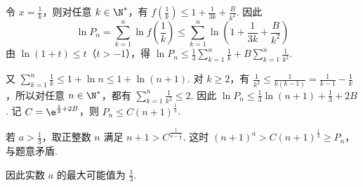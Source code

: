 \documentclass[UTF8,a4paper,oneside,11pt]{ctexbook}
\begin{document}
\begin{solution}
\begin{enumerate}
令 \(x=\frac{1}{k}\)，则对任意 \(k\in \N^*\)，有 \(f\left( \frac{1}{k} \right)\le 1+\frac{1}{3k}+\frac{B}{k^2}\). 因此
\[
\ln P_n=\sum_{k=1}^{n}\ln f\left( \frac{1}{k} \right)
\le \sum_{k=1}^{n}\ln \left( 1+\frac{1}{3k}+\frac{B}{k^2} \right)
\]
由 \(\ln \left( 1+t \right)\le t\)（\(t>-1\)），得 \(\ln P_n\le \frac{1}{3}\sum_{k=1}^{n}\frac{1}{k}+B\sum_{k=1}^{n}\frac{1}{k^2}\).

又 \(\sum_{k=1}^{n}\frac{1}{k}\le 1+\ln n\le 1+\ln \left( n+1 \right)\). 对 \(k\ge 2\)，有 \(\frac{1}{k^2}\le \frac{1}{k\left( k-1 \right)}=\frac{1}{k-1}-\frac{1}{k}\)，所以对任意 \(n\in \N^*\)，都有 \(\sum_{k=1}^{n}\frac{1}{k^2}\le 2\). 因此
\(\ln P_n\le \frac{1}{3}\ln \left( n+1 \right)+\frac{1}{3}+2B\).
记 \(C=\e^{\frac{1}{3}+2B}\)，则 \(P_n\le C\left( n+1 \right)^{\frac{1}{3}}\).

若 \(a>\frac{1}{3}\)，取正整数 \(n\) 满足 \(n+1>C^{\frac{1}{a-\frac{1}{3}}}\). 这时 \(\left( n+1 \right)^a>C\left( n+1 \right)^{\frac{1}{3}}\ge P_n\)，与题意矛盾.

因此实数 \(a\) 的最大可能值为 \(\frac{1}{3}\).
\end{enumerate}
\end{solution}

\end{document}

